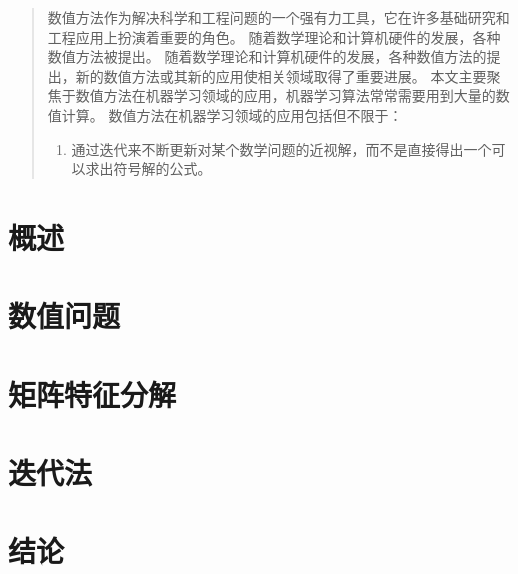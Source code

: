 \begin{abstract}
	数值方法作为解决科学和工程问题的一个强有力工具，它在许多基础研究和工程应用上扮演着重要的角色。
	随着数学理论和计算机硬件的发展，各种数值方法被提出。
	随着数学理论和计算机硬件的发展，各种数值方法的提出，新的数值方法或其新的应用使相关领域取得了重要进展。
	本文主要聚焦于数值方法在机器学习领域的应用，机器学习算法常常需要用到大量的数值计算。
	数值方法在机器学习领域的应用包括但不限于：
	\begin{enumerate}
		\item 通过迭代来不断更新对某个数学问题的近视解，而不是直接得出一个可以求出符号解的公式。
		
	\end{enumerate}
	
\end{abstract}

\chapter{概述}
\label{chap:intro}

\chapter{数值问题}
\label{chap:num_cond}

\chapter{矩阵特征分解}
\label{chap:matrix_decom}

\chapter{迭代法}
\label{chap:iter}

\chapter{结论}
\label{chap:conclusion}